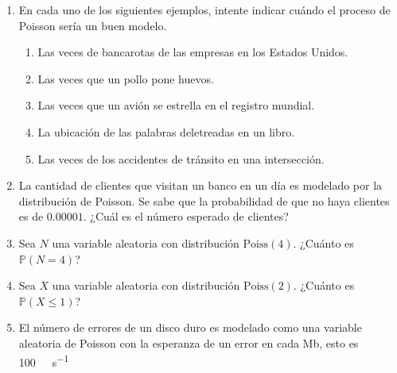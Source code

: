 \documentclass[10pt,twoside=false,twocolumn=false,BCOR=12mm,DIV=calc]{scrartcl} %
\theoremstyle{definition}
\begin{document}
\begin{enumerate}
	\item En cada uno de los siguientes ejemplos, intente indicar cuándo el proceso de Poisson sería un buen modelo.
	\begin{enumerate}
		\item Las veces de bancarotas de las empresas en los Estados Unidos.
		\item Las veces que un pollo pone huevos.
		\item Las veces que un avión se estrella en el registro mundial.
		\item La ubicación de las palabras deletreadas en un libro.
		\item Las veces de los accidentes de tránsito en una intersección.
	\end{enumerate}
	\item La cantidad de clientes que visitan un banco en un día es modelado por la distribución de Poisson. Se sabe que la probabilidad de que no haya clientes es de $0.00001$. ¿Cuál es el número esperado de clientes?
	\item Sea $N$ una variable aleatoria con distribución $\mathrm{Poiss}(4)$. ¿Cuánto es $\mathds{P}\left(N=4\right)$?
	\item Sea $X$ una variable aleatoria con distribución $\mathrm{Poiss}(2)$. ¿Cuánto es $\mathds{P}\left(X\le1\right)$?
	\item El número de errores de un disco duro es modelado como una variable aleatoria de Poisson con la esperanza de un error en cada Mb, esto es
	\SI{100}{\mega\byte\per\second}
\end{enumerate}

\vfill                                                                           
\nocite{*}                                                                       
\printbibliography[title={Referencias bibliográficas},heading=bibintoc]
\end{document}
